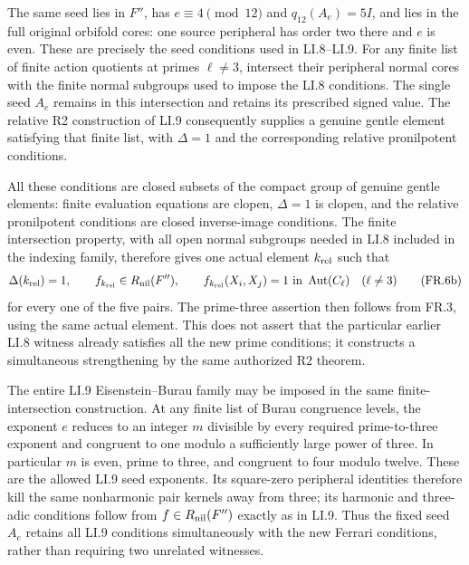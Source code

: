 The same seed lies in $F''$, has $e\equiv4\pmod{12}$ and
$q_{12}(A_e)=5I$, and lies in the full original orbifold cores:
one source peripheral has order two there and $e$ is even.
These are precisely the seed conditions used in LI.8--LI.9.
For any finite list of finite action quotients at primes
$\ell\ne3$, intersect their peripheral normal cores with
the finite normal subgroups used to impose the LI.8 conditions.
The single seed $A_e$ remains in this intersection and retains
its prescribed signed value. The relative R2 construction of
LI.9 consequently supplies a genuine gentle element satisfying
that finite list, with $\Delta=1$ and the corresponding
relative pronilpotent conditions.

All these conditions are closed subsets of the compact group
of genuine gentle elements: finite evaluation equations are
clopen, $\Delta=1$ is clopen, and the relative pronilpotent
conditions are closed inverse-image conditions. The finite
intersection property, with all open normal subgroups needed
in LI.8 included in the indexing family, therefore gives one
actual element $k_{\rm rel}$ such that
\[
 \Delta(k_{\rm rel})=1,\qquad
 f_{k_{\rm rel}}\in R_{\rm nil}(F''),
 \qquad
 f_{k_{\rm rel}}(X_i,X_j)=1
       \text{ in }\operatorname{Aut}(C_\ell)
       \quad(\ell\ne3)
 \tag{FR.6b}
\]
for every one of the five pairs. The prime-three assertion
then follows from FR.3, using the same actual element.
This does not assert that the particular earlier LI.8 witness
already satisfies all the new prime conditions; it constructs
a simultaneous strengthening by the same authorized R2 theorem.

The entire LI.9 Eisenstein--Burau family may be imposed in
the same finite-intersection construction. At any finite list
of Burau congruence levels, the exponent $e$ reduces to an
integer $m$ divisible by every required prime-to-three
exponent and congruent to one modulo a sufficiently large
power of three. In particular $m$ is even, prime to three,
and congruent to four modulo twelve. These are the allowed
LI.9 seed exponents. Its square-zero peripheral identities
therefore kill the same nonharmonic pair kernels away from
three; its harmonic and three-adic conditions follow from
$f\in R_{\rm nil}(F'')$ exactly as in LI.9. Thus the fixed
seed $A_e$ retains all LI.9 conditions simultaneously with
the new Ferrari conditions, rather than requiring two
unrelated witnesses.

